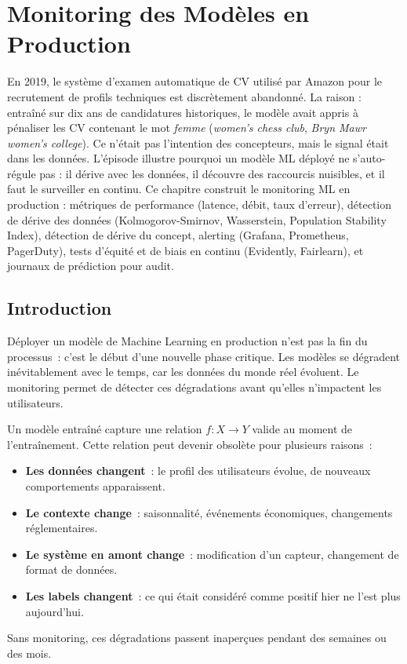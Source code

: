 \chapter{Monitoring des Mod\`eles en Production}
\label{ch:monitoring}

En 2019, le système d'examen automatique de CV utilisé par Amazon pour le recrutement de profils techniques est discrètement abandonné. La raison : entraîné sur dix ans de candidatures historiques, le modèle avait appris à pénaliser les CV contenant le mot \emph{femme} (\emph{women's chess club}, \emph{Bryn Mawr women's college}). Ce n'était pas l'intention des concepteurs, mais le signal était dans les données. L'épisode illustre pourquoi un modèle ML déployé ne s'auto-régule pas : il dérive avec les données, il découvre des raccourcis nuisibles, et il faut le surveiller en continu. Ce chapitre construit le monitoring ML en production : métriques de performance (latence, débit, taux d'erreur), détection de dérive des données (Kolmogorov-Smirnov, Wasserstein, Population Stability Index), détection de dérive du concept, alerting (Grafana, Prometheus, PagerDuty), tests d'équité et de biais en continu (Evidently, Fairlearn), et journaux de prédiction pour audit.

\section{Introduction}

D\'eployer un mod\`ele de Machine Learning en production n'est pas la fin du processus~: c'est le d\'ebut d'une nouvelle phase critique. Les mod\`eles se d\'egradent in\'evitablement avec le temps, car les donn\'ees du monde r\'eel \'evoluent. Le monitoring permet de d\'etecter ces d\'egradations avant qu'elles n'impactent les utilisateurs.

\begin{attention}[title=\textbf{Pourquoi les mod\`eles se d\'egradent-ils~?}]
Un mod\`ele entra\^in\'e capture une relation $f: X \to Y$ valide au moment de l'entra\^inement. Cette relation peut devenir obsol\`ete pour plusieurs raisons~:
\begin{itemize}
    \item \textbf{Les donn\'ees changent}~: le profil des utilisateurs \'evolue, de nouveaux comportements apparaissent.
    \item \textbf{Le contexte change}~: saisonnalit\'e, \'ev\'enements \'economiques, changements r\'eglementaires.
    \item \textbf{Le syst\`eme en amont change}~: modification d'un capteur, changement de format de donn\'ees.
    \item \textbf{Les labels changent}~: ce qui \'etait consid\'er\'e comme positif hier ne l'est plus aujourd'hui.
\end{itemize}
Sans monitoring, ces d\'egradations passent inaper\c{c}ues pendant des semaines ou des mois.
\end{attention}

